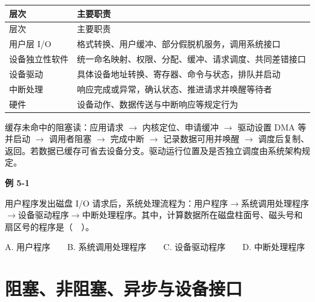 \par\smallskip
{\fontsize{9.3}{12}\selectfont\setlength{\tabcolsep}{2.5pt}\setlength{\LTleft}{0pt}\setlength{\LTright}{0pt}
\begin{longtable}{@{}>{\raggedright\arraybackslash}p{}>{\raggedright\arraybackslash}p{}@{}}
\toprule
层次 & 主要职责 \\

\midrule\endfirsthead\toprule
层次 & 主要职责 \\

\midrule\endhead\bottomrule\endfoot
用户层 I/O & 格式转换、用户缓冲、部分假脱机服务，调用系统接口 \\

设备独立性软件 & 统一命名映射、权限、分配、缓冲、请求调度、共同差错接口 \\

设备驱动 & 具体设备地址转换、寄存器、命令与状态，排队并启动 \\

中断处理 & 响应完成或异常，确认状态、推进请求并唤醒等待者 \\

硬件 & 设备动作、数据传送与中断响应等规定行为 \\

\end{longtable}}
\par\smallskip

缓存未命中的阻塞读：应用请求 \ensuremath{\to} 内核定位、申请缓冲 \ensuremath{\to} 驱动设置 DMA 等并启动 \ensuremath{\to} 调用者阻塞 \ensuremath{\to} 完成中断 \ensuremath{\to} 记录数据可用并唤醒 \ensuremath{\to} 调度后复制、返回。若数据已缓存可省去设备分支。驱动运行位置及是否独立调度由系统架构规定。

\par\medskip{}\noindent\hypertarget{OS05-E01}{}\label{OS05-E01}\textbf{例 5-1}\par\nobreak\smallskip

用户程序发出磁盘 I/O 请求后，系统处理流程为：用户程序\ensuremath{\to}系统调用处理程序\ensuremath{\to}设备驱动程序\ensuremath{\to}中断处理程序。其中，计算数据所在磁盘柱面号、磁头号和扇区号的程序是（　）。

A. 用户程序　　B. 系统调用处理程序　　C. 设备驱动程序　　D. 中断处理程序

\section{阻塞、非阻塞、异步与设备接口}\label{OS05-interfaces}

